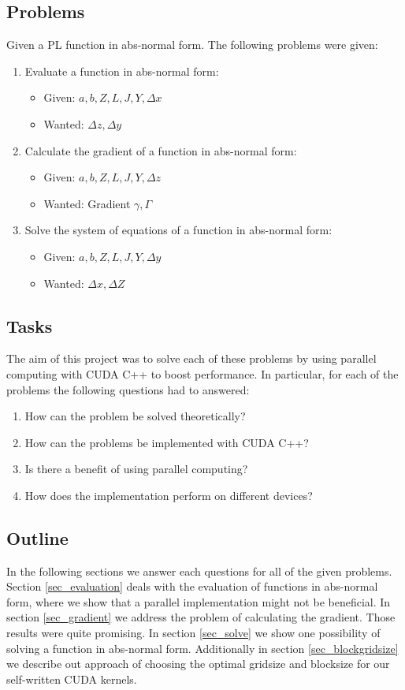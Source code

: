 \subsection{Problems}
Given a PL function in abs-normal form. The following problems were given:
\begin{enumerate}
	\item Evaluate a function in abs-normal form:
	\begin{itemize}
		\item Given: $a,b,Z,L,J,Y,\Delta x$
		\item Wanted: $\Delta z, \Delta y$
	\end{itemize}
	\item Calculate the gradient of a function in abs-normal form:
	\begin{itemize}
		\item Given: $a,b,Z,L,J,Y, \Delta z$
		\item Wanted: Gradient $\gamma, \Gamma$
	\end{itemize}
	\item Solve the system of equations of a function in abs-normal form:
	\begin{itemize}
		\item Given: $a,b,Z,L,J,Y,\Delta y$
		\item Wanted: $\Delta x, \Delta Z$
	\end{itemize}
\end{enumerate}

\subsection{Tasks}
The aim of this project was to solve each of these problems by using parallel computing with CUDA C++ to boost performance.
In particular, for each of the problems the following questions had to answered:
\begin{enumerate}[{(}I{)}]
	\item How can the problem be solved theoretically?
	\item How can the problems be implemented with CUDA C++?
	\item Is there a benefit of using parallel computing?
	\item How does the implementation perform on different devices?
\end{enumerate}

\subsection{Outline}
In the following sections we answer each questions for all of the given problems.
Section \ref{sec_evaluation} deals with the evaluation of functions in abs-normal form, where we show that a parallel implementation might not be beneficial. In section \ref{sec_gradient} we address the problem of calculating the gradient. Those results were quite promising. In section \ref{sec_solve} we show one possibility of solving a function in abs-normal form. Additionally in section \ref{sec_blockgridsize} we describe out approach of choosing the optimal gridsize and blocksize for our self-written CUDA kernels.


